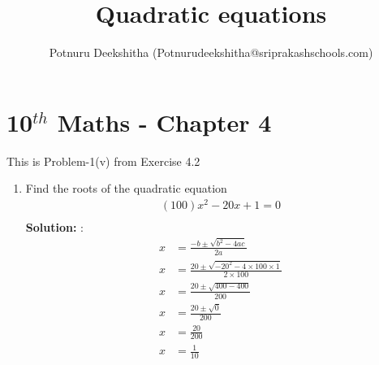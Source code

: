 \documentclass[12pt]{article}
\title{Quadratic equations}
\author{Potnuru Deekshitha (Potnurudeekshitha@sriprakashschools.com)}
\newcommand{\solution}{\noindent \textbf{Solution: }}
\begin{document}
\section*{10$^{th}$ Maths - Chapter 4}
This is Problem-1(v) from Exercise 4.2\\
\begin{enumerate}
    \item Find the roots of the quadratic equation\\
\begin{align}
(100)x^2-{20} x +{1} = 0\\
\end{align}
\solution:\\
\begin{align}
x &=\frac{-b\pm\sqrt{b^2-4ac}}{2a}\\
x &=\frac{20\pm\sqrt{-20^2-4 \times 100\times1}}{2 \times 100}\\
x &=\frac{20\pm\sqrt{400-400}}{200}\\
x &=\frac{20\pm\sqrt{0}}{200}\\
x &=\frac{20}{200}\\
x &=\frac{1}{10}
\end{align}
\end{enumerate}
\end{document}

